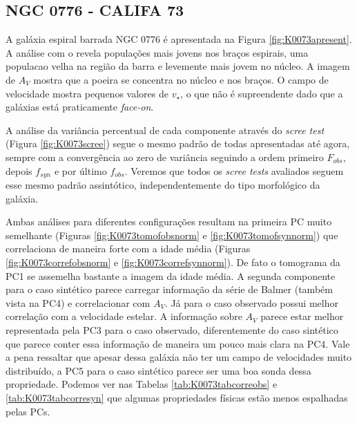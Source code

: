 \subsection{NGC 0776 - CALIFA 73}

A galáxia espiral barrada NGC 0776 é apresentada na Figura \ref{fig:K0073apresent}. A análise com o \starlight revela
populações mais jovens nos braços espirais, uma populacao velha na região da barra e levemente mais jovem no núcleo. A
imagem de $A_V$ mostra que a poeira se concentra no núcleo e nos braços. O campo de velocidade mostra pequenos valores
de $v_\star$, o que não é supreendente dado que a galáxias está praticamente {\em face-on}.

A análise da variância percentual de cada componente através do {\em scree test} (Figura \ref{fig:K0073scree}) segue o
mesmo padrão de todas apresentadas até agora, sempre com a convergência ao zero de variância seguindo a ordem primeiro
$F_{obs}$, depois $f_{syn}$ e por último $f_{obs}$. Veremos que todos os {\em scree tests} avaliados seguem esse mesmo
padrão assintótico, independentemente do tipo morfológico da galáxia.

Ambas análises para diferentes configurações resultam na primeira PC muito semelhante (Figuras
\ref{fig:K0073tomofobsnorm} e \ref{fig:K0073tomofsynnorm}) que correlaciona de maneira forte com a idade média (Figuras
\ref{fig:K0073correfobsnorm} e \ref{fig:K0073correfsynnorm}). De fato o tomograma da PC1 se assemelha bastante a imagem
da idade média. A segunda componente para o caso sintético parece carregar informação da série de Balmer (também vista
na PC4) e correlacionar com $A_V$. Já para o caso observado possui melhor correlação com a velocidade estelar. A
informação sobre $A_V$ parece estar melhor representada pela PC3 para o caso observado, diferentemente do caso sintético
que parece conter essa informação de maneira um pouco mais clara na PC4. Vale a pena ressaltar que apesar dessa galáxia
não ter um campo de velocidades muito distribuído, a PC5 para o caso sintético parece ser uma boa sonda dessa
propriedade. Podemos ver nas Tabelas \ref{tab:K0073tabcorreobs} e \ref{tab:K0073tabcorresyn} que algumas propriedades
físicas estão menos espalhadas pelas PCs.

